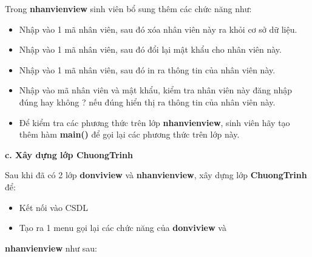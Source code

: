 Trong \textbf{nhanvienview} sinh viên bổ sung thêm các chức năng như:
\begin{itemize}
\item Nhập vào 1 mã nhân viên, sau đó xóa nhân viên này ra khỏi cơ sở dữ liệu.
\item Nhập vào 1 mã nhân viên, sau đó đổi lại mật khẩu cho nhân viên này.
\item Nhập vào 1 mã nhân viên, sau đó in ra thông tin của nhân viên này.
\item Nhập vào mã nhân viên và mật khẩu, kiểm tra nhân viên này đăng nhập đúng hay không ? nếu đúng hiển thị ra thông tin của nhân viên này.
\item Để kiểm tra các phương thức trên lớp \textbf{nhanvienview}, sinh viên hãy tạo thêm hàm \textbf{main()} để gọi lại các phương thức trên lớp này.\\
\end{itemize}

 \textbf{ c. Xây dựng lớp ChuongTrinh} 
 
 Sau khi đã có 2 lớp \textbf{donviview} và \textbf{nhanvienview}, xây dựng lớp \textbf{ChuongTrinh} để:
 \begin{itemize}
 	\item Kết nối vào CSDL
 	\item Tạo ra 1 menu gọi lại các chức năng của \textbf{donviview} và
 \end{itemize}
  \textbf{nhanvienview} như sau:
 
